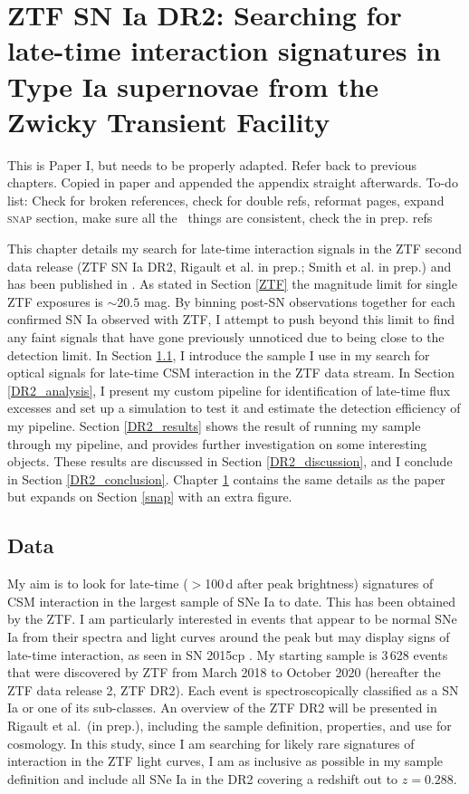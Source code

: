 \documentclass[a4paper,oneside,12pt, class=Latex/Classes/PhDthesisPSnPDF, crop=false]{standalone}
\begin{document}
\doublespacing
\chapter{ZTF SN Ia DR2: Searching for late-time interaction signatures in Type Ia supernovae from the Zwicky Transient Facility}
\label{chap:DR2_search}


\color{red} This is Paper I, but needs to be properly adapted. Refer back to previous chapters. Copied in paper and appended the appendix straight afterwards. To-do list: Check for broken references, check for double refs, reformat pages, expand \textsc{snap} section, make sure all the \ztfg\ztfr\ztfi\ things are consistent, check the in prep. refs\color{black}

This chapter details my search for late-time interaction signals in the ZTF second data release (ZTF SN Ia DR2, Rigault et al. in prep.; Smith et al. in prep.) and has been published in \cite{Terwel_2024_paper1}. As stated in Section \ref{ZTF} the magnitude limit for single ZTF exposures is $\sim20.5$ mag. By binning post-SN observations together for each confirmed SN Ia observed with ZTF, I attempt to push beyond this limit to find any faint signals that have gone previously unnoticed due to being close to the detection limit. In Section \ref{DR2_data}, I introduce the sample I use in my search for optical signals for late-time CSM interaction in the ZTF data stream. In Section \ref{DR2_analysis}, I present my custom pipeline for identification of late-time flux excesses and set up a simulation to test it and estimate the detection efficiency of my pipeline. Section \ref{DR2_results} shows the result of running my sample through my pipeline, and provides further investigation on some interesting objects. These results are discussed in Section \ref{DR2_discussion}, and I conclude in Section \ref{DR2_conclusion}. Chapter \ref{chap:DR2_search} contains the same details as the paper but expands on Section \ref{snap} with an extra figure.


\section{Data}
\label{DR2_data}
My aim is to look for late-time ($>$100\,d after peak brightness) signatures of CSM interaction in the largest sample of SNe Ia to date. This has been obtained by the ZTF. I am particularly interested in events that appear to be normal SNe Ia from their spectra and light curves around the peak but may display signs of late-time interaction, as seen in SN 2015cp \citep{2015cp}. My starting sample is 3\,628 events that were discovered by ZTF from March 2018 to October 2020 (hereafter the ZTF data release 2, ZTF DR2). Each event is spectroscopically classified as a SN Ia or one of its sub-classes. An overview of the ZTF DR2 will be presented in Rigault et al.~(in prep.), including the sample definition, properties, and use for cosmology. In this study, since I am searching for likely rare signatures of interaction in the ZTF light curves, I am as inclusive as possible in my sample definition and include all SNe Ia in the DR2 covering a redshift out to $z = 0.288$. 
\end{document}
